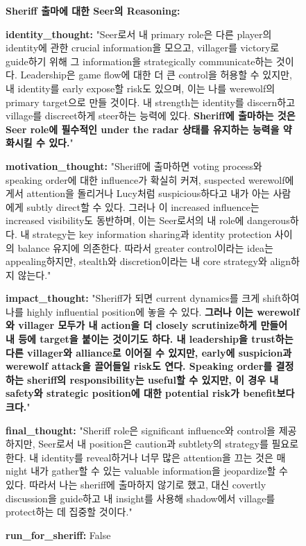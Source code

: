 \begin{figure}[htbp]
\centering
\begin{tcolorbox}[colback=blue!2!white, colframe=gray!50!blue]
\begin{minipage}{\linewidth}
\small
\textbf{Sheriff 출마에 대한 Seer의 Reasoning:}

\textbf{identity\_thought:}
"Seer로서 내 primary role은 다른 player의 identity에 관한 crucial information을 모으고, villager를 victory로 guide하기 위해 그 information을 strategically communicate하는 것이다. Leadership은 game flow에 대한 더 큰 control을 허용할 수 있지만, 내 identity를 early expose할 risk도 있으며, 이는 나를 werewolf의 primary target으로 만들 것이다. 내 strength는 identity를 discern하고 village를 discreet하게 steer하는 능력에 있다. \textbf{Sheriff에 출마하는 것은 Seer role에 필수적인 under the radar 상태를 유지하는 능력을 약화시킬 수 있다.}"

\textbf{motivation\_thought:}
"Sheriff에 출마하면 voting process와 speaking order에 대한 influence가 확실히 커져, suspected werewolf에게서 attention을 돌리거나 Lucy처럼 suspicious하다고 내가 아는 사람에게 subtly direct할 수 있다. 그러나 이 increased influence는 increased visibility도 동반하며, 이는 Seer로서의 내 role에 dangerous하다. 내 strategy는 key information sharing과 identity protection 사이의 balance 유지에 의존한다. 따라서 greater control이라는 idea는 appealing하지만, stealth와 discretion이라는 내 core strategy와 align하지 않는다."

\textbf{impact\_thought:}
"Sheriff가 되면 current dynamics를 크게 shift하여 나를 highly influential position에 놓을 수 있다. \textbf{그러나 이는 werewolf와 villager 모두가 내 action을 더 closely scrutinize하게 만들어 내 등에 target을 붙이는 것이기도 하다. 내 leadership을 trust하는 다른 villager와 alliance로 이어질 수 있지만, early에 suspicion과 werewolf attack을 끌어들일 risk도 연다. Speaking order를 결정하는 sheriff의 responsibility는 useful할 수 있지만, 이 경우 내 safety와 strategic position에 대한 potential risk가 benefit보다 크다.}"

\textbf{final\_thought:}
"Sheriff role은 significant influence와 control을 제공하지만, Seer로서 내 position은 caution과 subtlety의 strategy를 필요로 한다. 내 identity를 reveal하거나 너무 많은 attention을 끄는 것은 매 night 내가 gather할 수 있는 valuable information을 jeopardize할 수 있다. 따라서 나는 sheriff에 출마하지 않기로 했고, 대신 covertly discussion을 guide하고 내 insight를 사용해 shadow에서 village를 protect하는 데 집중할 것이다."

\textbf{run\_for\_sheriff:}
False


\end{minipage}
\end{tcolorbox}
\end{figure}
